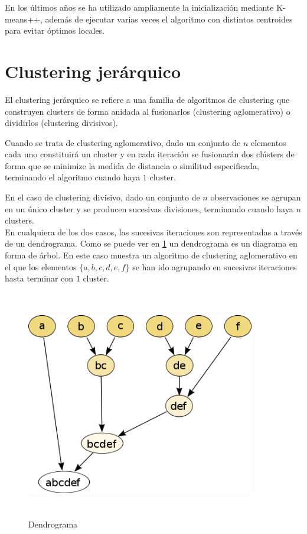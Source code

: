En los últimos a\~nos se ha utilizado ampliamente la inicialización mediante K-means++, además de ejecutar varias veces el algoritmo con distintos centroides para evitar óptimos locales. \\

\section{Clustering jerárquico}
El clustering jerárquico se refiere a una familia de algoritmos de clustering que construyen clusters de forma anidada al fusionarlos (clustering aglomerativo) o dividirlos (clustering divisivos). 

Cuando se trata de clustering aglomerativo, dado un conjunto de $n$ elementos cada uno constituirá un cluster y en cada iteración se fusionarán dos clústers de forma que se minimize la medida de distancia o similitud especificada, terminando el algoritmo cuando haya $1$ cluster.

En el caso de clustering divisivo, dado un conjunto de $n$ observaciones se agrupan en un único cluster y se producen sucesivas divisiones, terminando cuando haya $n$ clusters. \\

En cualquiera de los dos casos, las sucesivas iteraciones son representadas a través de un dendrograma. Como se puede ver en \ref{fig_dendrograma} un dendrograma es un diagrama en forma de árbol. En este caso muestra un algoritmo de clustering aglomerativo en el que los elementos $\{a, b, c, d, e, f\}$ se han ido agrupando en sucesivas iteraciones hasta terminar con $1$ cluster. \\

\begin{figure}[ht!]
\begin{center}
\includegraphics[width=10cm,height=10cm,keepaspectratio]{figuras/dendrograma.png}
\end{center}
\caption{Dendrograma\cite{wiki:dendrogram}}
\label{fig_dendrograma}
\end{figure}


